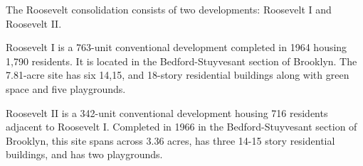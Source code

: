 The Roosevelt consolidation consists of two developments: Roosevelt I and Roosevelt II. \par \vspace{.7\baselineskip}Roosevelt I is a 763-unit conventional development completed in 1964 housing 1,790 residents. It is located in the Bedford-Stuyvesant section of Brooklyn. The 7.81-acre site has six 14,15, and 18-story residential buildings along with green space and five playgrounds. \par \vspace{.7\baselineskip}Roosevelt II is a 342-unit conventional development housing 716 residents adjacent to Roosevelt I. Completed in 1966 in the Bedford-Stuyvesant section of Brooklyn, this site spans across 3.36 acres, has three 14-15 story residential buildings, and has two playgrounds.